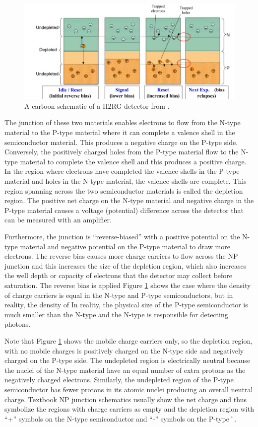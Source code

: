 \documentclass{aastex62}
\begin{document}
\begin{figure}[!hbtp]
\centering
\includegraphics[width=.6\columnwidth]{smith_np_junction.png}
\caption{A cartoon schematic of a H2RG detector from \citet{smith2008imgPersistence}. }\label{fig:npSchematic}
\end{figure}

The junction of these two materials enables electrons to flow from the N-type material to the P-type material where it can complete a valence shell in the semiconductor material.
This produces a negative charge on the P-type side.
Conversely, the positively charged holes from the P-type material flow to the N-type material to complete the valence shell and this produces a positive charge.
In the region where electrons have completed the valence shells in the P-type material and holes in the N-type material, the valence shells are complete.
This region spanning across the two semiconductor materials is called the depletion region.
The positive net charge on the N-type material and negative charge in the P-type material causes a voltage (potential) difference across the detector that can be measured with an amplifier.

Furthermore, the junction is ``reverse-biased'' with a positive potential on the N-type material and negative potential on the P-type material to draw more electrons.
The reverse bias causes more charge carriers to flow across the NP junction and this increases the size of the depletion region, which also increases the well depth or capacity of electrons that the detector may collect before saturation.
The reverse bias is applied 
Figure \ref{fig:npSchematic} shows the case where the density of charge carriers is equal in the N-type and P-type semiconductors, but in reality, the density of In reality, the physical size of the P-type semiconductor is much smaller than the N-type and the N-type is responsible for detecting photons.

Note that Figure \ref{fig:npSchematic} shows the mobile charge carriers only, so the depletion region, with no mobile charges is positively charged on the N-type side and negatively charged on the P-type side.
The undepleted region is electrically neutral because the nuclei of the N-type material have an equal number of extra protons as the negatively charged electrons.
Similarly, the undepleted region of the P-type semiconductor has fewer protons in its atomic nuclei producing an overall neutral charge.
Textbook NP junction schematics usually show the net charge and thus symbolize the regions with charge carriers as empty and the depletion region with ``+'' symbols on the N-type semiconductor and ``-'' symbols on the P-type˚.
\end{document}
